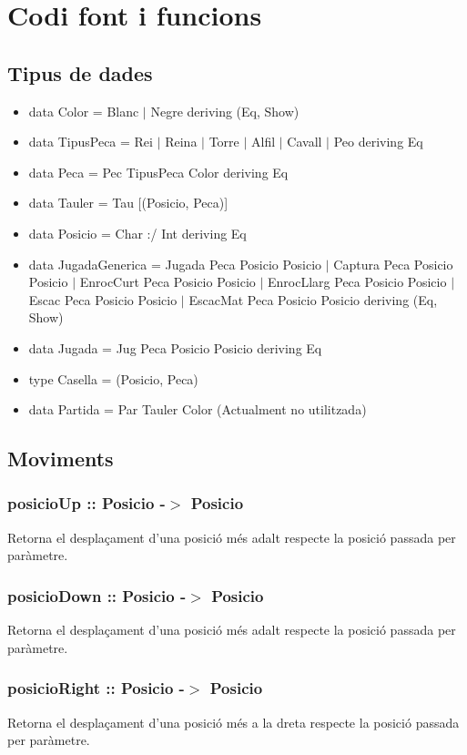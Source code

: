 \documentclass{article}
\begin{document}
\newpage
\section{Codi font i funcions}
\subsection{Tipus de dades}
\begin{itemize}
    \item data Color = Blanc $|$ Negre deriving (Eq, Show)
    \item data TipusPeca = Rei $|$ Reina $|$ Torre $|$ Alfil $|$ Cavall $|$ Peo deriving Eq
    \item data Peca = Pec TipusPeca Color deriving Eq
    \item data Tauler = Tau [(Posicio, Peca)]
    \item data Posicio = Char :/ Int deriving Eq
    \item data JugadaGenerica = Jugada Peca Posicio Posicio $|$ Captura Peca Posicio Posicio $|$ EnrocCurt Peca Posicio Posicio $|$ EnrocLlarg Peca Posicio Posicio $|$ Escac Peca Posicio Posicio $|$ EscacMat Peca Posicio Posicio deriving (Eq, Show)
    \item data Jugada = Jug Peca Posicio Posicio deriving Eq
    \item type Casella = (Posicio, Peca)
    \item data Partida = Par Tauler Color (Actualment no utilitzada)
\end{itemize}
\subsection{Moviments}
\subsubsection*{posicioUp :: Posicio -$>$ Posicio}
Retorna el desplaçament d'una posició més adalt respecte la posició passada per paràmetre.
\subsubsection*{posicioDown :: Posicio -$>$ Posicio}
Retorna el desplaçament d'una posició més adalt respecte la posició passada per paràmetre.
\subsubsection*{posicioRight :: Posicio -$>$ Posicio}
Retorna el desplaçament d'una posició més a la dreta respecte la posició passada per paràmetre.
\end{document}

